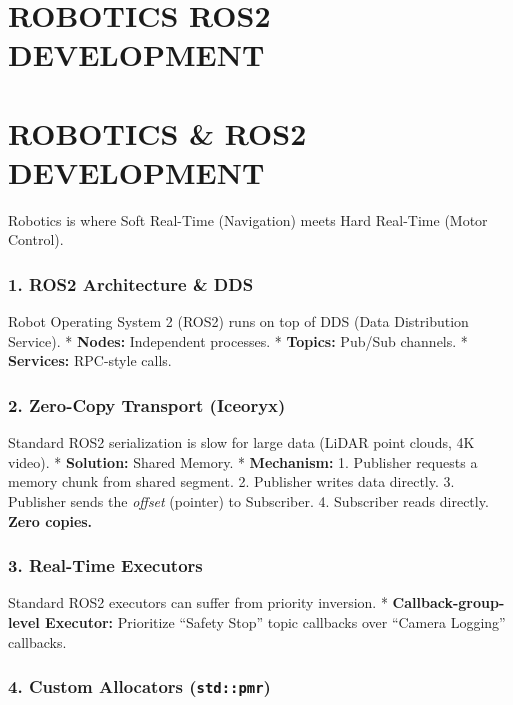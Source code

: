 \hypertarget{robotics-ros2-development}{%
\chapter{ROBOTICS ROS2 DEVELOPMENT}\label{robotics-ros2-development}}

\hypertarget{robotics-ros2-development-1}{%
\chapter{ROBOTICS \& ROS2
DEVELOPMENT}\label{robotics-ros2-development-1}}

Robotics is where Soft Real-Time (Navigation) meets Hard Real-Time
(Motor Control).

\hypertarget{ros2-architecture-dds}{%
\subsection{1. ROS2 Architecture \& DDS}\label{ros2-architecture-dds}}

Robot Operating System 2 (ROS2) runs on top of DDS (Data Distribution
Service). * \textbf{Nodes:} Independent processes. * \textbf{Topics:}
Pub/Sub channels. * \textbf{Services:} RPC-style calls.

\hypertarget{zero-copy-transport-iceoryx}{%
\subsection{2. Zero-Copy Transport
(Iceoryx)}\label{zero-copy-transport-iceoryx}}

Standard ROS2 serialization is slow for large data (LiDAR point clouds,
4K video). * \textbf{Solution:} Shared Memory. * \textbf{Mechanism:} 1.
Publisher requests a memory chunk from shared segment. 2. Publisher
writes data directly. 3. Publisher sends the \emph{offset} (pointer) to
Subscriber. 4. Subscriber reads directly. \textbf{Zero copies.}

\hypertarget{real-time-executors}{%
\subsection{3. Real-Time Executors}\label{real-time-executors}}

Standard ROS2 executors can suffer from priority inversion. *
\textbf{Callback-group-level Executor:} Prioritize ``Safety Stop'' topic
callbacks over ``Camera Logging'' callbacks.

\hypertarget{custom-allocators-stdpmr}{%
\subsection{\texorpdfstring{4. Custom Allocators
(\texttt{std::pmr})}{4. Custom Allocators (std::pmr)}}\label{custom-allocators-stdpmr}}

